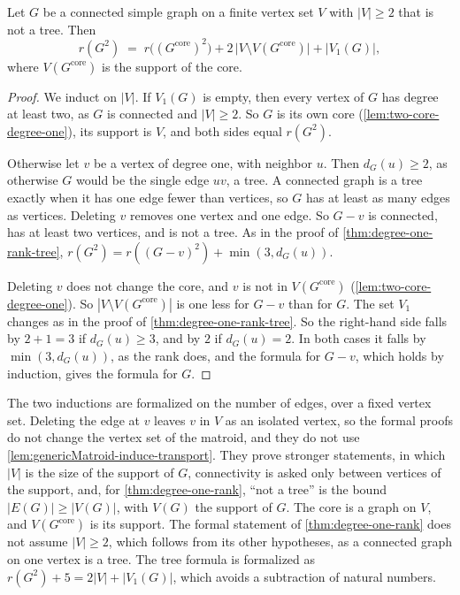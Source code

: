 \begin{theorem}
  \label{thm:degree-one-rank}
  \leanok
  Let $G$ be a connected simple graph on a finite vertex set $V$ with
  $|V| \ge 2$ that is not a tree. Then
  \[
    r(G^2) \;=\; r\bigl((G^{\mathrm{core}})^2\bigr)
      + 2\,\bigl|V \setminus V(G^{\mathrm{core}})\bigr|
      + |V_1(G)| ,
  \]
  where $V(G^{\mathrm{core}})$ is the support of the core.
\end{theorem}
\begin{proof}
  \leanok
  We induct on $|V|$. If $V_1(G)$ is empty, then every vertex of $G$
  has degree at least two, as $G$ is connected and $|V| \ge 2$. So $G$
  is its own core (\cref{lem:two-core-degree-one}), its support is $V$,
  and both sides equal $r(G^2)$.

  Otherwise let $v$ be a vertex of degree one, with neighbor $u$. Then
  $d_G(u) \ge 2$, as otherwise $G$ would be the single edge $uv$, a
  tree. A connected graph is a tree exactly when it has one edge fewer
  than vertices, so $G$ has at least as many edges as vertices. Deleting
  $v$ removes one vertex and one edge. So $G - v$ is connected, has at
  least two vertices, and is not a tree. As in the proof of
  \cref{thm:degree-one-rank-tree},
  $r(G^2) = r((G - v)^2) + \min(3, d_G(u))$.

  Deleting $v$ does not change the core, and $v$ is not in
  $V(G^{\mathrm{core}})$ (\cref{lem:two-core-degree-one}). So
  $|V \setminus V(G^{\mathrm{core}})|$ is one less for $G - v$ than for
  $G$. The set $V_1$ changes as in the proof of
  \cref{thm:degree-one-rank-tree}. So the right-hand side falls by
  $2 + 1 = 3$ if $d_G(u) \ge 3$, and by $2$ if $d_G(u) = 2$. In both
  cases it falls by $\min(3, d_G(u))$, as the rank does, and the formula
  for $G - v$, which holds by induction, gives the formula for $G$.
\end{proof}

\begin{fmlnote}
  \label{fmlnote:degree-one-fixed-carrier}
  The two inductions are formalized on the number of edges, over a fixed
  vertex set. Deleting the edge at $v$ leaves $v$ in $V$ as an isolated
  vertex, so the formal proofs do not change the vertex set of the
  matroid, and they do not use \cref{lem:genericMatroid-induce-transport}.
  They prove stronger statements, in which $|V|$ is the size of the
  support of $G$, connectivity is asked only between vertices of the
  support, and, for \cref{thm:degree-one-rank}, ``not a tree'' is the
  bound $|E(G)| \ge |V(G)|$, with $V(G)$ the support of $G$. The core is
  a graph on $V$, and $V(G^{\mathrm{core}})$ is its support. The formal
  statement of \cref{thm:degree-one-rank} does not assume $|V| \ge 2$,
  which follows from its other hypotheses, as a connected graph on one
  vertex is a tree. The tree formula is formalized as
  $r(G^2) + 5 = 2|V| + |V_1(G)|$, which avoids a subtraction of natural
  numbers.
\end{fmlnote}
